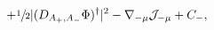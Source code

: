 \begin{equation}
 +\sfrac{1}{2}|(D_{A_+,A_-}\Phi)^\dagger|^2-
 \nabla_{-\mu}\mathcal{J}_{-\mu}+C_-,
\end{equation}

